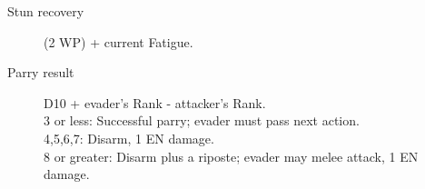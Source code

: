 {\begin{minipage}{\linewidth}
\begin{multicols}{2}
\begin{description}
\item[Stun recovery] (2 \x WP) + current Fatigue.

\item[Parry result] D10 + evader's Rank - attacker's Rank. \\
3 or less: Successful parry; evader must pass next action. \\
4,5,6,7: Disarm, 1 EN damage. \\
8 or greater: Disarm plus a riposte; evader may melee attack, 1 EN damage. \\
\end{description}
\end{multicols}
\end{minipage}}
